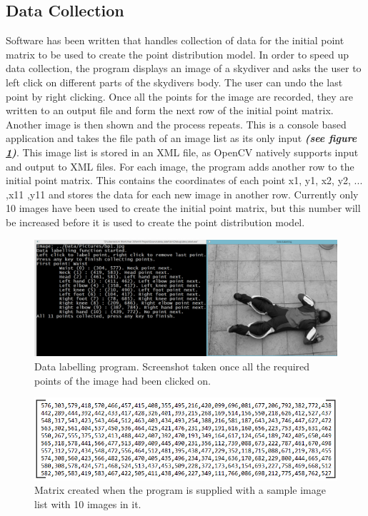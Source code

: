 \documentclass[a4paper, 12pt]{article}
\begin{document}
	\subsection{Data Collection}
	Software has been written that handles collection of data for the initial point 			matrix to be used to create the point distribution model. In order to speed up data collection, the program displays an image of a skydiver and asks the user to left click on different parts of the skydivers body. The user can undo the last point by right clicking. Once all the points for the image are recorded, they are written to an output file and form the next row of the initial point matrix. Another image is then shown and the process repeats. This is a console based application and takes the file path of an image list as its only input \textbf{\emph{(see figure \ref{fig:data_collection})}}. This image list is stored in an XML file, as OpenCV natively supports input and output to XML files. For each image, the program adds another row to the initial point matrix. This contains the coordinates of each point x1, y1, x2, y2, ... ,x11 ,y11 and stores the data for each new image in another row. Currently only 10 images have been used to create the initial point matrix, but this number will be increased before it is used to create the point distribution model.
%
\begin{figure}[H]
	\centering
	\includegraphics[width=\linewidth]{data_collection.png}
	\caption{Data labelling program. Screenshot taken once all the required points of the image had been clicked on.}
	\label{fig:data_collection}
\end{figure}
%
\begin{figure}[H]
	\centering
	\includegraphics[width=\linewidth]{initial_matrix.png}
	\caption{Matrix created when the program is supplied with a sample image list with 10 images in it.}
	\label{fig:initial_matrix}
\end{figure}
%
\end{document}
